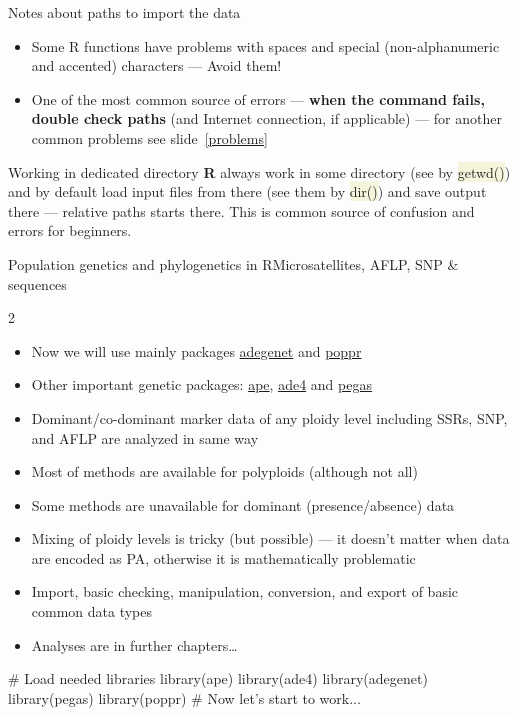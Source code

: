 \documentclass[compress, xelatex, 11pt, xcolor=svgnames, aspectratio=169, url={hyphens, lowtilde}]{beamer}
\renewcommand{\texttt}[1]{\colorbox{Beige}{{\ttfamily #1}}}
\begin{document}
\begin{frame}[allowframebreaks]{Notes about paths to import the data}
\begin{itemize}
\begin{itemize}
		\end{itemize}
		\item Some R functions have problems with spaces and special (non-alphanumeric and accented) characters --- Avoid them!
		\item One of the most common source of errors --- \textbf{when the command fails, double check paths} (and Internet connection, if applicable) --- for another common problems see slide~\ref{problems}
	\end{itemize}
	\begin{alertblock}{Working in dedicated directory}
		\textbf{R} always work in some directory (see by \texttt{getwd()}) and by default load input files from there (see them by \texttt{dir()}) and save output there --- relative paths starts there. This is common source of confusion and errors for beginners.
	\end{alertblock}
\end{frame}

\begin{frame}[fragile]{Population genetics and phylogenetics in R}{Microsatellites, AFLP, SNP \& sequences}
	\begin{multicols}{2}
		\begin{itemize}
			\item Now we will use mainly packages \href{https://adegenet.r-forge.r-project.org/}{adegenet} and \href{https://grunwaldlab.github.io/poppr/}{poppr}
			\item Other important genetic packages: \href{https://emmanuelparadis.r-universe.dev/ape}{ape}, \href{https://sdray.github.io/software/}{ade4} and \href{https://emmanuelparadis.github.io/pegas.html}{pegas}
			\item Dominant/co-dominant marker data of any ploidy level including SSRs, SNP, and AFLP are analyzed in same way
			\item Most of methods are available for polyploids (although not all)
			\item Some methods are unavailable for dominant (presence/absence) data
			\item Mixing of ploidy levels is tricky (but possible) --- it doesn't matter when data are encoded as PA, otherwise it is mathematically problematic
			\item Import, basic checking, manipulation, conversion, and export of basic common data types
			\item Analyses are in further chapters\ldots
		\end{itemize}
		\begin{spluscode}
    # Load needed libraries
    library(ape)
    library(ade4)
    library(adegenet)
    library(pegas)
    library(poppr)
    # Now let's start to work...
		\end{spluscode}
	\end{multicols}
\end{frame}
\end{document}
